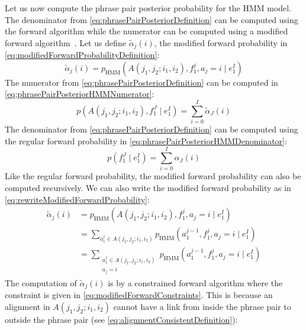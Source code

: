 Let us now compute the phrase pair posterior probability for the HMM model. The
denominator from \autoref{eq:phrasePairPosteriorDefinition} can be computed using
the forward algorithm while the numerator can be computed using a modified
forward algorithm~\citep{deng:2005:PHD}. Let us define $\tilde{\alpha}_j(i)$, the
modified forward probability in \autoref{eq:modifiedForwardProbabilityDefinition}:
%
\begin{equation}
  \tilde{\alpha}_j(i) = p_{\text{HMM}}(A(j_1,j_2;i_1,i_2), f_1^j, a_j=i \mid e_1^I)
  \label{eq:modifiedForwardProbabilityDefinition}
\end{equation}
%
The numerator from \autoref{eq:phrasePairPosteriorDefinition} can be computed
in \autoref{eq:phrasePairPosteriorHMMNumerator}:
%
\begin{equation}
  p(A(j_1, j_2; i_1, i_2), f_1^J \mid e_1^I) = \sum_{i=0}^I \tilde{\alpha}_J(i)
  \label{eq:phrasePairPosteriorHMMNumerator}
\end{equation}
%
The denominator from \autoref{eq:phrasePairPosteriorDefinition} can be computed
using the regular forward probability in
\autoref{eq:phrasePairPosteriorHMMDenominator}:
%
\begin{equation}
  p(f_1^J \mid e_1^I) = \sum_{i=0}^I \alpha_J(i)
  \label{eq:phrasePairPosteriorHMMDenominator}
\end{equation}
%
Like the regular forward probability, the modified forward probability can also
be computed recursively. We can also write the modified forward probability as
in \autoref{eq:rewriteModifiedForwardProbability}:
%
\begin{equation}
  \begin{split}
  \tilde{\alpha}_j(i) &= p_{\text{HMM}}(A(j_1,j_2;i_1,i_2), f_1^j, a_j=i \mid e_1^I) \\
                      &= \sum_{a_1^{j} \in A(j_1,j_2;i_1,i_2)} p_{\text{HMM}}(a_1^{j-1}, f_1^j, a_j=i \mid e_1^I) \\
                      &= \sum_{\substack{a_1^{j} \in A(j_1,j_2;i_1,i_2) \\ a_j=i}} p_{\text{HMM}}(a_1^{j-1}, f_1^j, a_j=i \mid e_1^I)
  \end{split}
  \label{eq:rewriteModifiedForwardProbability}
\end{equation}
%
The computation of $\tilde{\alpha}_j(i)$ is by a constrained forward algorithm where
the constraint is given in \autoref{eq:modifiedForwardConstraints}. This is because
an alignment in $A(j_1,j_2;i_1,i_2)$  cannot have a link from inside the phrase
pair to outside the phrase pair (see \autoref{eq:alignmentConsistentDefinition}):
